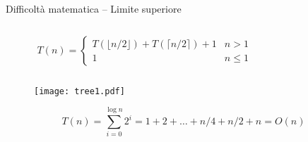 \begin{frame}{Difficoltà matematica -- Limite superiore}

\vspace{-6pt}
\begin{mybox}
\begin{columns}[c]
\begin{column}{0.64\textwidth}
\[
T(n) = \begin{cases}
      T( \lfloor n/2 \rfloor )  + T( \lceil n/2 \rceil) + 1 & n > 1 \\
     1 & n \leq 1
  \end{cases}
\]
\end{column}
\begin{column}{0.35\textwidth}
\end{column}
\end{columns}
\end{mybox}


\begin{overprint}
\begin{figure}
	\texttt{[image: tree1.pdf]}
\end{figure}
\[
T(n) = \sum_{i=0}^{\log n} 2^i = 1 + 2 + \ldots + n/4 + n/2 + n = O(n)
\]
\end{overprint}

\end{frame}

